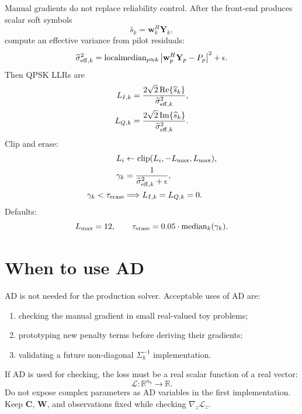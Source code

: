 \documentclass[11pt]{article}
\newcommand{\R}{\mathbb{R}}
\newcommand{\abs}[1]{\left\lvert #1 \right\rvert}
\newcommand{\re}{\operatorname{Re}}
\newcommand{\im}{\operatorname{Im}}
\newcommand{\clip}{\operatorname{clip}}
\begin{document}
Manual gradients do not replace reliability control.  After the front-end produces scalar soft symbols
\begin{equation}
\widehat s_k=\mathbf w_k^H\mathbf Y_k,
\end{equation}
compute an effective variance from pilot residuals:
\begin{equation}
\widehat\sigma_{{\rm eff},k}^2
=\operatorname{localmedian}_{p\approx k}
\abs{\mathbf w_p^H\mathbf Y_p-P_p}^2+\epsilon.
\end{equation}
Then QPSK LLRs are
\begin{align}
L_{I,k}&=\frac{2\sqrt2\re\{\widehat s_k\}}{\widehat\sigma_{{\rm eff},k}^2},\\
L_{Q,k}&=\frac{2\sqrt2\im\{\widehat s_k\}}{\widehat\sigma_{{\rm eff},k}^2}.
\end{align}
Clip and erase:
\begin{align}
L_i&\leftarrow \clip(L_i,-L_{\max},L_{\max}),\\
\gamma_k&=\frac{1}{\widehat\sigma_{{\rm eff},k}^2+\epsilon},\\
\gamma_k<\tau_{\rm erase}&\Longrightarrow L_{I,k}=L_{Q,k}=0.
\end{align}
Defaults:
\begin{equation}
L_{\max}=12,
\qquad
\tau_{\rm erase}=0.05\cdot\operatorname{median}_k(\gamma_k).
\end{equation}

\section{When to use AD}

AD is not needed for the production solver.  Acceptable uses of AD are:
\begin{enumerate}[label=(\alph*)]
\item checking the manual gradient in small real-valued toy problems;
\item prototyping new penalty terms before deriving their gradients;
\item validating a future non-diagonal $\Sigma_k^{-1}$ implementation.
\end{enumerate}

If AD is used for checking, the loss must be a real scalar function of a real vector:
\begin{equation}
\mathcal L:\R^{n_b}\rightarrow\R.
\end{equation}
Do not expose complex parameters as AD variables in the first implementation.  Keep $\mathbf C$, $\mathbf W$, and observations fixed while checking $\nabla_z\mathcal L_z$.
\end{document}
